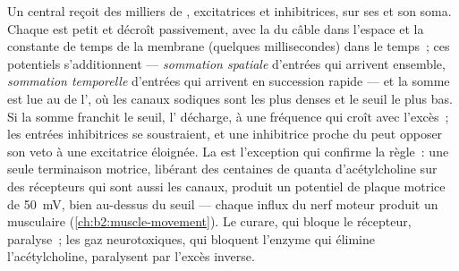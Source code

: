 \begin{proposition}\label{prop:b2:neurons-synapses:integration}
Un  central reçoit des milliers de , excitatrices et
inhibitrices, sur ses  et son soma. Chaque  est petit et décroît passivement, avec la  du câble dans l'espace et la constante de temps de la membrane
(quelques millisecondes) dans le temps~; ces potentiels s'additionnent
--- \emph{sommation spatiale} d'entrées qui arrivent ensemble,
\emph{sommation temporelle} d'entrées qui arrivent en succession rapide
--- et la somme est lue au \emph{} de l', où les
canaux sodiques sont les plus denses et le seuil le plus bas. Si la
somme franchit le seuil, l' décharge, à une fréquence qui croît avec
l'excès~; les entrées inhibitrices se soustraient, et une 
inhibitrice proche du  peut opposer son veto à une
 excitatrice éloignée. La
 est l'exception qui confirme la règle~: une
seule terminaison motrice, libérant des centaines de quanta
d'acétylcholine sur des récepteurs qui sont aussi les canaux, produit un
potentiel de plaque motrice de \qty{50}{mV}, bien au-dessus du seuil ---
chaque influx du nerf moteur produit un  musculaire
(\cref{ch:b2:muscle-movement}). Le curare, qui bloque le récepteur,
paralyse~; les gaz neurotoxiques, qui bloquent l'enzyme qui élimine
l'acétylcholine, paralysent par l'excès inverse.
\end{proposition}

